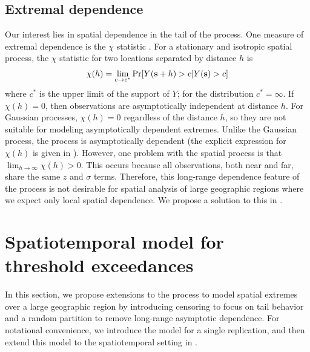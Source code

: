 \documentclass[useAMS,usenatbib,referee]{biom}
\begin{document}
\subsection{Extremal dependence}\label{sts:extdep}
Our interest lies in spatial dependence in the tail of the \skewt process.
One measure of extremal dependence is the $\chi$ statistic \citep{Coles1999}.
For a stationary and isotropic spatial process, the $\chi$ statistic for two locations separated by distance $h$ is
\begin{align} \label{steq:chih}
  \chi(h) = \lim_{c \rightarrow c^*} \Pr[Y(\bs + h) > c | Y(\bs) > c]
\end{align}
where $c^*$ is the upper limit of the support of $Y$; for the \skewt distribution $c^* = \infty$.
If $\chi(h) = 0$, then observations are asymptotically independent at distance $h$.
For Gaussian processes, $\chi(h) = 0$ regardless of the distance $h$, so they are not suitable for modeling asymptotically dependent extremes.
Unlike the Gaussian process, the \skewt process is asymptotically dependent (the explicit expression for $\chi(h)$ is given in ).
However, one problem with the spatial \skewt process is that $\lim_{h \rightarrow \infty} \chi(h) > 0$.
This occurs because all observations, both near and far, share the same $z$ and $\sigma$ terms.
Therefore, this long-range dependence feature of the \skewt process is not desirable for spatial analysis of large geographic regions where we expect only local spatial dependence.
We propose a solution to this in .

\section{Spatiotemporal \skewt model for threshold exceedances}\label{sts:spatial}
In this section, we propose extensions to the \skewt process to model spatial extremes over a large geographic region by introducing censoring to focus on tail behavior and a random partition to remove long-range asymptotic dependence.
For notational convenience, we introduce the model for a single replication, and then extend this model to the spatiotemporal setting in .
\end{document}
